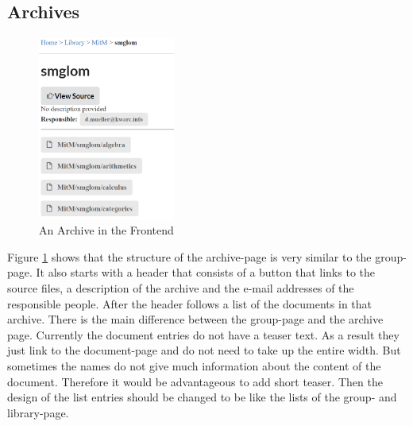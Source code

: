 \documentclass[11pt,a4paper]{article}
\begin{document}
\subsection{Archives}
\begin{figure}[H]
\centerline{\includegraphics[width=0.4\textwidth]{archive.png}}
\caption{An Archive in the Frontend}
\label{fig:archive}
\end{figure}
Figure \ref{fig:archive} shows that the structure of the archive-page is very similar to the group-page.
It also starts with a header that consists of a button that links to the source files, a description of the archive and the e-mail addresses of the responsible people. 
\newline \newline
After the header follows a list of the documents in that archive.
There is the main difference between the group-page and the archive page.
Currently the document entries do not have a teaser text.
As a result they just link to the document-page and do not need to take up the entire width.
But sometimes the names do not give much information about the content of the document.
Therefore it would be advantageous to add short teaser.
Then the design of the list entries should be changed to be like the lists of the group- and library-page.
\end{document}

